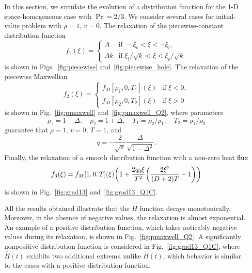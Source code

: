 \documentclass{article}
\begin{document}
In this section, we simulate the evolution of a distribution function
for the 1-D space-homogeneous case with $\Pr = 2/3$.
We consider several cases for initial-value problem with $\rho=1$, $v=0$.
The relaxation of the piecewise-constant distribution function
\begin{equation}\label{eq:piecewise}
    f_1(\xi) = \begin{cases}
        A &\text{if } -\xi_o < \xi < -\xi_i, \\
        Ak &\text{if } \xi_i/\sqrt{k} < \xi < \xi_o/\sqrt{k}
    \end{cases}
\end{equation}
is shown in Figs.~\ref{fig:piecewise} and~\ref{fig:piecewise_hole}.
The relaxation of the piecewise Maxwellian
\begin{equation}\label{eq:pmaxwell}
    f_2(\xi) = \begin{cases}
        f_M[\rho_1, 0, T_1](\xi) &\text{if } \xi < 0, \\
        f_M[\rho_2, 0, T_2](\xi) &\text{if } \xi > 0
    \end{cases}
\end{equation}
is shown in Fig.~\ref{fig:pmaxwell} and~\ref{fig:pmaxwell_Q2}, where parameters
\begin{equation}\label{eq:pmaxwell_params}
    \rho_1 = 1-\Delta, \quad \rho_2 = 1+\Delta, \quad T_1 = \rho_2/\rho_1, \quad T_2 = \rho_1/\rho_2
\end{equation}
guarantee that $\rho=1$, $v=0$, $T=1$, and
\begin{equation}\label{eq:pmaxwell_q}
    q = -\frac2{\sqrt\pi}\frac{\Delta}{\sqrt{1-\Delta^2}}.
\end{equation}
Finally, the relaxation of a smooth distribution function with a non-zero heat flux
\begin{equation}\label{eq:grad13}
    f_3(\xi) = f_M[1, 0, T](\xi)\qty(1 + \frac{2q_0\xi}{T^2}\qty(\frac{2\xi^2}{(D+2)T} - 1))
\end{equation}
is shown in Fig.~\ref{fig:grad13} and~\ref{fig:grad13_Q1C}.

All the results obtained illustrate that the $H$ function decays monotonically.
Moreover, in the absence of negative values, the relaxation is almost exponential.
An example of a positive distribution function,
which takes noticably negative values during its relaxation, is shown in Fig.~\ref{fig:pmaxwell_Q2}.
A significantly nonpositive distribution function is considered in Fig.~\ref{fig:grad13_Q1C},
where $\hat{H}(t)$ exhibits two additional extrema unlike $\tilde{H}(t)$,
which behavior is similar to the cases with a positive distribution function.
\end{document}
